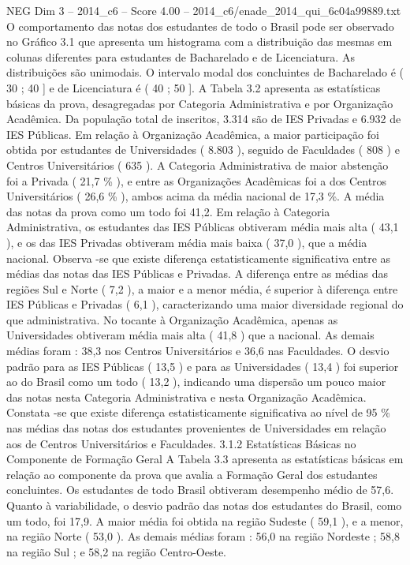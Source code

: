 \begin{textsample}{NEG Dim 3 – 2014\_c6 – Score 4.00 – 2014\_c6/enade\_2014\_qui\_6c04a99889.txt}
O comportamento das notas dos estudantes de todo o Brasil pode ser observado no Gráfico 3.1 que apresenta um histograma com a distribuição das mesmas em colunas diferentes para estudantes de Bacharelado e de Licenciatura.
As distribuições são unimodais.
O intervalo modal dos concluintes de Bacharelado é ( 30 ; 40 ] e de Licenciatura é ( 40 ; 50 ].
A Tabela 3.2 apresenta as estatísticas básicas da prova, desagregadas por Categoria Administrativa e por Organização Acadêmica.
Da população total de inscritos, 3.314 são de IES Privadas e 6.932 de IES Públicas.
Em relação à Organização Acadêmica, a maior participação foi obtida por estudantes de Universidades ( 8.803 ), seguido de Faculdades ( 808 ) e Centros Universitários ( 635 ).
A Categoria Administrativa de maior abstenção foi a Privada ( 21,7 \% ), e entre as Organizações Acadêmicas foi a dos Centros Universitários ( 26,6 \% ), ambos acima da média nacional de 17,3 \%.
A média das notas da prova como um todo foi 41,2.
Em relação à Categoria Administrativa, os estudantes das IES Públicas obtiveram média mais alta ( 43,1 ), e os das IES Privadas obtiveram média mais baixa ( 37,0 ), que a média nacional.
Observa -se que existe diferença estatisticamente significativa entre as médias das notas das IES Públicas e Privadas.
A diferença entre as médias das regiões Sul e Norte ( 7,2 ), a maior e a menor média, é superior à diferença entre IES Públicas e Privadas ( 6,1 ), caracterizando uma maior diversidade regional do que administrativa.
No tocante à Organização Acadêmica, apenas as Universidades obtiveram média mais alta ( 41,8 ) que a nacional.
As demais médias foram : 38,3 nos Centros Universitários e 36,6 nas Faculdades.
O desvio padrão para as IES Públicas ( 13,5 ) e para as Universidades ( 13,4 ) foi superior ao do Brasil como um todo ( 13,2 ), indicando uma dispersão um pouco maior das notas nesta Categoria Administrativa e nesta Organização Acadêmica.
Constata -se que existe diferença estatisticamente significativa ao nível de 95 \% nas médias das notas dos estudantes provenientes de Universidades em relação aos de Centros Universitários e Faculdades. 3.1.2 Estatísticas Básicas no Componente de Formação Geral A Tabela 3.3 apresenta as estatísticas básicas em relação ao componente da prova que avalia a Formação Geral dos estudantes concluintes.
Os estudantes de todo Brasil obtiveram desempenho médio de 57,6.
Quanto à variabilidade, o desvio padrão das notas dos estudantes do Brasil, como um todo, foi 17,9.
A maior média foi obtida na região Sudeste ( 59,1 ), e a menor, na região Norte ( 53,0 ).
As demais médias foram : 56,0 na região Nordeste ; 58,8 na região Sul ; e 58,2 na região Centro-Oeste.

\end{textsample}

